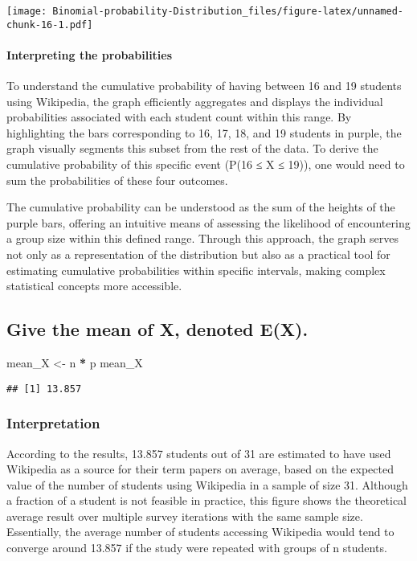 \documentclass[
]{article}
\newenvironment{Shaded}{\begin{snugshade}}{\end{snugshade}}
\newcommand{\NormalTok}[1]{#1}
\newcommand{\OtherTok}[1]{\textcolor[rgb]{0.56,0.35,0.01}{#1}}
\newcommand{\SpecialCharTok}[1]{\textcolor[rgb]{0.81,0.36,0.00}{\textbf{#1}}}
\begin{document}
\texttt{[image: Binomial-probability-Distribution\_files/figure-latex/unnamed-chunk-16-1.pdf]}

\paragraph{Interpreting the
probabilities}\label{interpreting-the-probabilities}

To understand the cumulative probability of having between 16 and 19
students using Wikipedia, the graph efficiently aggregates and displays
the individual probabilities associated with each student count within
this range. By highlighting the bars corresponding to 16, 17, 18, and 19
students in purple, the graph visually segments this subset from the
rest of the data. To derive the cumulative probability of this specific
event (P(16 ≤ X ≤ 19)), one would need to sum the probabilities of these
four outcomes.

The cumulative probability can be understood as the sum of the heights
of the purple bars, offering an intuitive means of assessing the
likelihood of encountering a group size within this defined range.
Through this approach, the graph serves not only as a representation of
the distribution but also as a practical tool for estimating cumulative
probabilities within specific intervals, making complex statistical
concepts more accessible.

\subsection{Give the mean of X, denoted
E(X).}\label{give-the-mean-of-x-denoted-ex.}

\begin{Shaded}
\begin{Highlighting}[]
\NormalTok{mean\_X }\OtherTok{\textless{}{-}}\NormalTok{ n }\SpecialCharTok{*}\NormalTok{ p}
\NormalTok{mean\_X}
\end{Highlighting}
\end{Shaded}

\begin{verbatim}
## [1] 13.857
\end{verbatim}

\subsubsection{Interpretation}\label{interpretation-10}

According to the results, 13.857 students out of 31 are estimated to
have used Wikipedia as a source for their term papers on average, based
on the expected value of the number of students using Wikipedia in a
sample of size 31. Although a fraction of a student is not feasible in
practice, this figure shows the theoretical average result over multiple
survey iterations with the same sample size. Essentially, the average
number of students accessing Wikipedia would tend to converge around
13.857 if the study were repeated with groups of n students.
\end{document}
